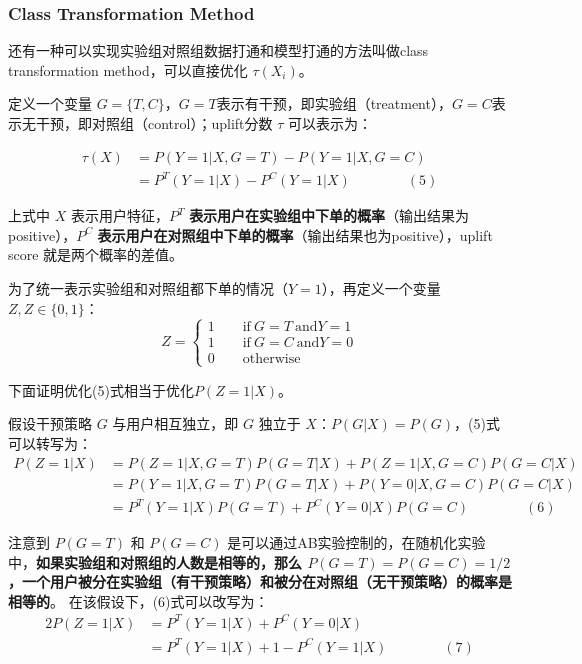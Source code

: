 \documentclass[12pt]{article}
\begin{document}
\subsubsection{Class Transformation Method}
还有一种可以实现实验组对照组数据打通和模型打通的方法叫做class transformation method，可以直接优化 $\tau(X_i)$。

定义一个变量 $G = \{T, C\}$，$G = T$表示有干预，即实验组（treatment），$G = C$表示无干预，即对照组（control）；uplift分数 $\tau$ 可以表示为：

\begin{align*}
\tau(X) &= P(Y = 1|X, G = T) - P(Y = 1|X, G = C) \\
	    &= P^T(Y = 1|X) - P^C(Y = 1|X) \qquad \qquad (5)
\end{align*}

上式中 $X$ 表示用户特征，$P^T$ \textbf{表示用户在实验组中下单的概率}（输出结果为positive），$P^C$ \textbf{表示用户在对照组中下单的概率}（输出结果也为positive），uplift score 就是两个概率的差值。

为了统一表示实验组和对照组都下单的情况（$Y = 1$），再定义一个变量$Z, Z \in \{0, 1\}$：
$$
Z = \begin{cases}
1 \qquad \text{if} \ G = T \ \text{and} Y = 1 \\
1 \qquad \text{if} \ G = C \ \text{and} Y = 0 \\
0 \qquad \text{otherwise}
\end{cases}
$$

下面证明优化(5)式相当于优化$P (Z=1 | X)$。

假设干预策略 $G$ 与用户相互独立，即 $G$ 独立于 $X$：$P(G|X) = P(G)$，(5)式可以转写为：
\begin{align*}
P(Z = 1|X) &= P(Z=1|X, G=T) P(G = T|X) + P(Z=1|X, G = C)P(G=C|X) \\
	&= P(Y=1|X, G=T) P(G = T|X) + P(Y=0|X, G = C)P(G=C|X) \\
	&= P^T(Y = 1|X)P(G = T) + P^C(Y=0|X)P(G=C) \qquad \qquad (6)
\end{align*}

注意到 $P(G=T)$ 和 $P(G=C)$ 是可以通过AB实验控制的，在随机化实验中，\textbf{如果实验组和对照组的人数是相等的，那么 $P(G=T)=P(G=C)=1/2$，一个用户被分在实验组（有干预策略）和被分在对照组（无干预策略）的概率是相等的}。 在该假设下，(6)式可以改写为：
\begin{align*}
2P(Z=1|X) &= P^T(Y=1|X) + P^C(Y=0|X) \\
	&= P^T(Y=1|X) + 1 - P^C(Y=1|X) \qquad \qquad (7)
\end{align*}
\end{document}
